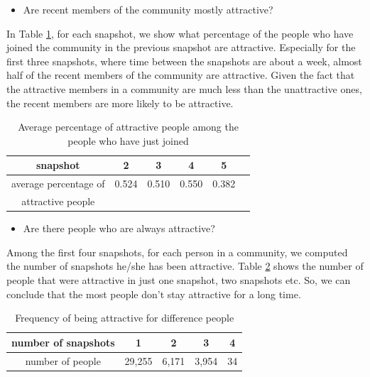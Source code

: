 \begin{itemize}
\item Are recent members of the community mostly attractive?
\end{itemize}

In Table \ref{table:rec}, for each snapshot,  we show what percentage of the people who
have joined the community in the previous snapshot are attractive.
 Especially for the first three snapshots, where
time between the snapshots are about a week, almost half of the recent members of the community are 
attractive. Given the fact that the attractive members in a community are much less than the unattractive 
ones, the recent members are more likely to be attractive.

\begin{table}[htdp]
\caption{Average percentage of attractive people among the people who have just joined}
\begin{center}
\begin{tabular}{|c|c|c|c|c|c}
\hline
snapshot & 2 & 3 & 4 & 5 \\ \hline
average percentage of   & 0.524 & 0.510 & 0.550 & 0.382 \\
attractive people  &  &  & &  \\ \hline
\end{tabular}
\end{center}
\label{table:rec}
\end{table}


\begin{itemize}
\item Are there people who are always attractive?
\end{itemize}

Among the first four snapshots, for each person in a community, we computed the number of snapshots
he/she has been attractive. Table  \ref{table:all} shows the number of people that were attractive in just one snapshot, two snapshots etc.
So, we can conclude that the most people don't stay attractive for a long time.

\begin{table}[htdp]
\caption{Frequency of being  attractive for difference people}
\begin{center}
\begin{tabular}{|c|c|c|c|c|}
\hline
number of snapshots & 1 & 2 & 3 & 4  \\ \hline
number of people  & 29,255 & 6,171 & 3,954 & 34 \\ \hline
\end{tabular}
\end{center}
\label{table:all}
\end{table}%

